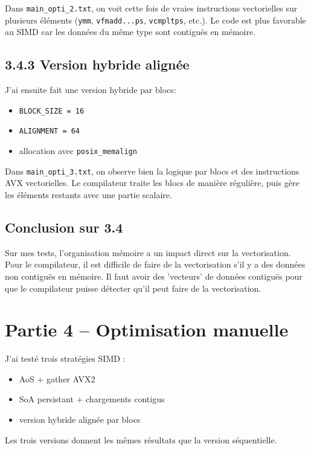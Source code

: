 \documentclass[a4paper,12pt]{article}
\begin{document}
Dans \texttt{main\_opti\_2.txt}, on voit cette fois de vraies instructions vectorielles sur plusieurs éléments (\texttt{ymm}, \texttt{vfmadd...ps}, \texttt{vcmpltps}, etc.). Le code est plus favorable au SIMD car les données du même type sont contiguës en mémoire.

\subsection{3.4.3 Version hybride alignée}
J'ai ensuite fait une version hybride par blocs:
\begin{itemize}
    \item \texttt{BLOCK\_SIZE = 16}
    \item \texttt{ALIGNMENT = 64}
    \item allocation avec \texttt{posix\_memalign}
\end{itemize}

Dans \texttt{main\_opti\_3.txt}, on observe bien la logique par blocs et des instructions AVX vectorielles. Le compilateur traite les blocs de manière régulière, puis gère les éléments restants avec une partie scalaire.

\subsection{Conclusion sur 3.4}

Sur mes tests, l'organisation mémoire a un impact direct sur la vectorisation. Pour le compilateur, il est difficile de faire de la vectorisation s'il y a des données non contiguës en mémoire. Il faut avoir des 'vecteurs' de données contiguës pour que le compilateur puisse détecter qu'il peut faire de la vectorisation.

\newpage

\section{Partie 4 -- Optimisation manuelle}

J'ai testé trois stratégies SIMD :
\begin{itemize}
    \item AoS + gather AVX2
    \item SoA persistant + chargements contigus
    \item version hybride alignée par blocs
\end{itemize}

Les trois versions donnent les mêmes résultats que la version séquentielle.
\end{document}
